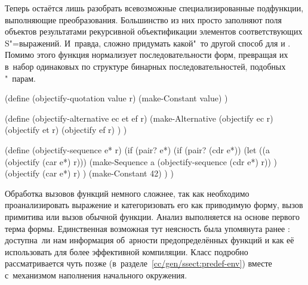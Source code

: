 Теперь остаётся лишь разобрать всевозможные специализированные подфункции,
выполняющие преобразования. Большинство из них просто заполняют поля объектов
результатами рекурсивной объектификации элементов соответствующих S"=выражений.
И~правда, сложно придумать какой"~то другой способ для
 и . Помимо этого функция
 нормализует последовательности форм, превращая их
в~набор одинаковых по структуре бинарных последовательностей, подобных
"~парам.

\begin{code:lisp}
(define (objectify-quotation value r)
  (make-Constant value) )

(define (objectify-alternative ec et ef r)
  (make-Alternative (objectify ec r)
                    (objectify et r)
                    (objectify ef r) ) )

(define (objectify-sequence e* r)
  (if (pair? e*)
      (if (pair? (cdr e*))
          (let ((a (objectify (car e*) r)))
            (make-Sequence a (objectify-sequence (cdr e*) r)) )
          (objectify (car e*) r) )
      (make-Constant 42) ) )
\end{code:lisp}

Обработка вызовов функций немного сложнее, так как необходимо проанализировать
выражение и категоризовать его как приводимую форму, вызов примитива или вызов
обычной функции. Анализ выполняется на основе первого терма формы. Единственная
возможная тут неясность была упомянута ранее
: доступна~ли нам информация об~арности
предопределённых функций и как её использовать для более эффективной компиляции.
Класс  подробно рассматривается чуть позже
(в~разделе~\ref{cc/gen/ssect:predef-env}) вместе с~механизмом наполнения
начального окружения.

